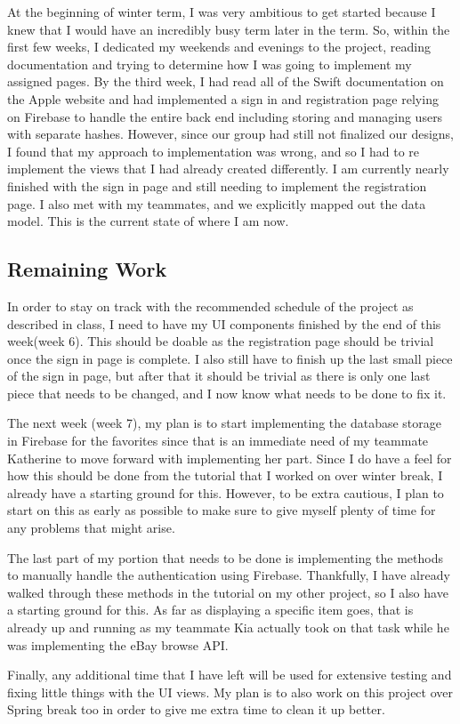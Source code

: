 \documentclass[onecolumn, draftclsnofoot,10pt, compsoc]{IEEEtran}
\begin{document}
\par At the beginning of winter term, I was very ambitious to get started because I knew that I would have an incredibly busy term later in the term. So, within the first few weeks, I dedicated my weekends and evenings to the project, reading documentation and trying to determine how I was going to implement my assigned pages. By the third week, I had read all of the Swift documentation on the Apple website and had implemented a sign in and registration page relying on Firebase to handle the entire back end including storing and managing users with separate hashes. However, since our group had still not finalized our designs, I found that my approach to implementation was wrong, and so I had to re implement the views that I had already created differently.  I am currently nearly finished with the sign in page and still needing to implement the registration page. I also met with my teammates, and we explicitly mapped out the data model. This is the current state of where I am now. 

\subsection{Remaining Work}
\par In order to stay on track with the recommended schedule of the project as described in class, I need to have my UI components finished by the end of this week(week 6). This should be doable as the registration page should be trivial once the sign in page is complete. I also still have to finish up the last small piece of the sign in page, but after that it should be trivial as there is only one last piece that needs to be changed, and I now know what needs to be done to fix it. 
\par The next week (week 7), my plan is to start implementing the database storage in Firebase for the favorites since that is an immediate need of my teammate Katherine to move forward with implementing her part. Since I do have a feel for how this should be done from the tutorial that I worked on over winter break, I already have a starting ground for this. However, to be extra cautious, I plan to start on this as early as possible to make sure to give myself plenty of time for any problems that might arise. 
\par The last part of my portion that needs to be done is implementing the methods to manually handle the authentication using Firebase. Thankfully, I have already walked through these methods in the tutorial on my other project, so I also have a starting ground for this. As far as displaying a specific item goes, that is already up and running as my teammate Kia actually took on that task while he was implementing the eBay browse API.  
\par Finally, any additional time that I have left will be used for extensive testing and fixing little things with the UI views. My plan is to also work on this project over Spring break too in order to give me extra time to clean it up better. 
\end{document}
